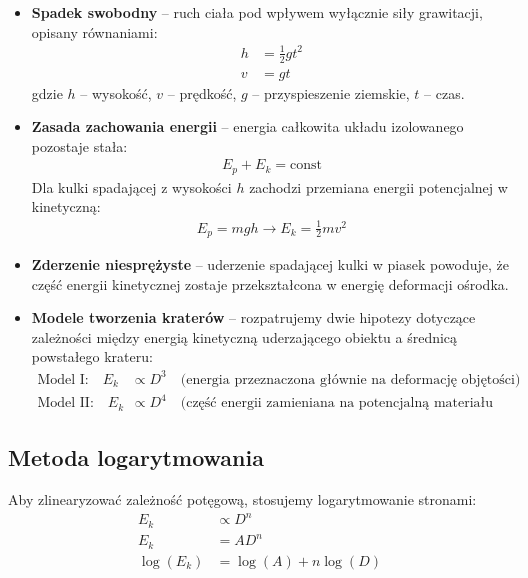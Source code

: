 \documentclass[a4paper,12pt]{article}
\begin{document}
\begin{itemize}
    \item \textbf{Spadek swobodny} -- ruch ciała pod wpływem wyłącznie siły grawitacji, opisany równaniami:
    \begin{align*}
        h &= \frac{1}{2}gt^2 \\
        v &= gt
    \end{align*}
    gdzie $h$ -- wysokość, $v$ -- prędkość, $g$ -- przyspieszenie ziemskie, $t$ -- czas.
    
    \item \textbf{Zasada zachowania energii} -- energia całkowita układu izolowanego pozostaje stała:
    \begin{align*}
        E_p + E_k = \text{const}
    \end{align*}
    Dla kulki spadającej z wysokości $h$ zachodzi przemiana energii potencjalnej w kinetyczną:
    \begin{align*}
        E_p = mgh \rightarrow E_k = \frac{1}{2}mv^2
    \end{align*}
    
    \item \textbf{Zderzenie niesprężyste} -- uderzenie spadającej kulki w piasek powoduje, że część energii kinetycznej zostaje przekształcona w energię deformacji ośrodka.
    
    \item \textbf{Modele tworzenia kraterów} -- rozpatrujemy dwie hipotezy dotyczące zależności między energią kinetyczną uderzającego obiektu a średnicą powstałego krateru:
    \begin{align*}
        \text{Model I:} \quad E_k &\propto D^3 \quad \text{(energia przeznaczona głównie na deformację objętości)} \\
        \text{Model II:} \quad E_k &\propto D^4 \quad \text{(część energii zamieniana na potencjalną materiału wyrzuconego)}
    \end{align*}
\end{itemize}

\subsection*{Metoda logarytmowania}

Aby zlinearyzować zależność potęgową, stosujemy logarytmowanie stronami:
\begin{align*}
    E_k &\propto D^n \\
    E_k &= AD^n \\
    \log(E_k) &= \log(A) + n\log(D)
\end{align*}
\end{document}
